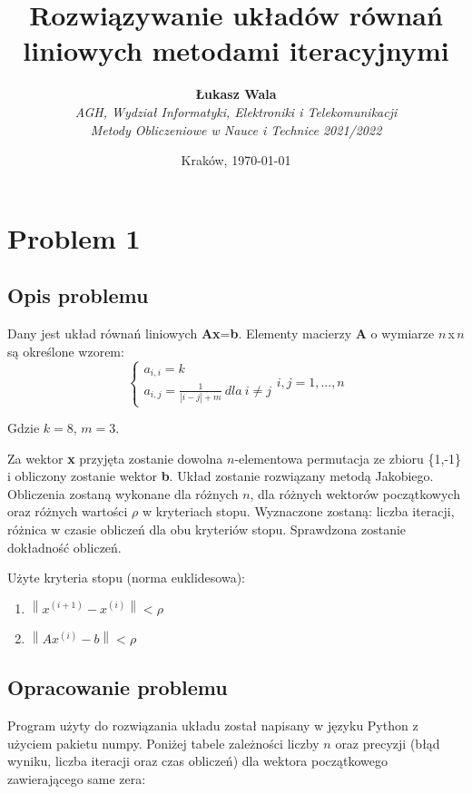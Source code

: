\documentclass{article}
\title{Rozwiązywanie układów równań liniowych metodami iteracyjnymi}
\author{\textbf{Łukasz Wala}\\
    \textit{AGH, Wydział Informatyki, Elektroniki i Telekomunikacji} \\
    \textit{Metody Obliczeniowe w Nauce i Technice 2021/2022}}
\date{Kraków, \today}
\begin{document}
\maketitle

\section{Problem 1}
\subsection{Opis problemu}
Dany jest układ równań liniowych \textbf{Ax}=\textbf{b}.
Elementy macierzy \textbf{A} o wymiarze $n$\,x\,$n$ są określone wzorem:
$$
\begin{cases}
    a_{i,i}=k\\
    a_{i,j}=\frac{1}{|i-j|+m} \ dla \ i \ne j
\end{cases}i,j=1,...,n
$$

Gdzie $k=8$, $m=3$.

Za wektor \textbf{x} przyjęta zostanie dowolna $n$-elementowa permutacja ze zbioru \{1,-1\} i obliczony zostanie
wektor \textbf{b}. Układ zostanie rozwiązany metodą Jakobiego. Obliczenia zostaną wykonane dla różnych $n$,
dla różnych wektorów początkowych oraz różnych wartości $\rho$ w kryteriach stopu. Wyznaczone zostaną: liczba iteracji,
różnica w czasie obliczeń dla obu kryteriów stopu. Sprawdzona zostanie dokładność obliczeń.

Użyte kryteria stopu (norma euklidesowa):
\begin{enumerate}
    \item 
    $\left\|x^{(i+1)}-x^{(i)}\right\| < \rho$
    \item
    $\left\|Ax^{(i)}-b\right\| < \rho$
\end{enumerate}

\subsection{Opracowanie problemu}
Program użyty do rozwiązania układu został napisany w języku Python z użyciem pakietu numpy. Poniżej tabele zależności
liczby $n$ oraz precyzji (błąd wyniku, liczba iteracji oraz czas obliczeń) dla wektora początkowego zawierającego same
zera:

\newpage
\thispagestyle{empty}
\end{document}
